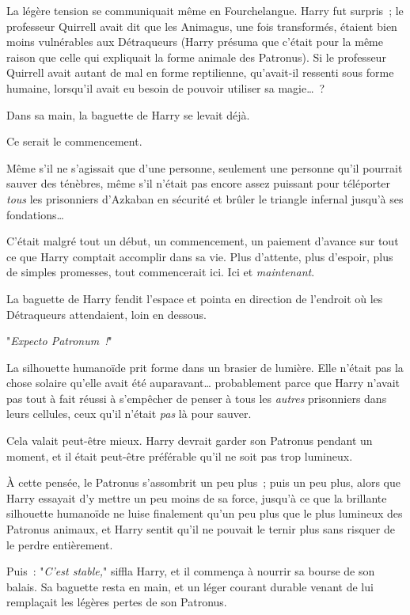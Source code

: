 La légère tension se communiquait même en Fourchelangue. Harry fut surpris~; le professeur Quirrell avait dit que les Animagus, une fois transformés, étaient bien moins vulnérables aux Détraqueurs (Harry présuma que c'était pour la même raison que celle qui expliquait la forme animale des Patronus). Si le professeur Quirrell avait autant de mal en forme reptilienne, qu'avait-il ressenti sous forme humaine, lorsqu'il avait eu besoin de pouvoir utiliser sa magie…~?

Dans sa main, la baguette de Harry se levait déjà.

Ce serait le commencement.

Même s'il ne s'agissait que d'une personne, seulement une personne qu'il pourrait sauver des ténèbres, même s'il n'était pas encore assez puissant pour téléporter \emph{tous} les prisonniers d'Azkaban en sécurité et brûler le triangle infernal jusqu'à ses fondations…

C'était malgré tout un début, un commencement, un paiement d'avance sur tout ce que Harry comptait accomplir dans sa vie. Plus d'attente, plus d'espoir, plus de simples promesses, tout commencerait ici. Ici et \emph{maintenant}.

La baguette de Harry fendit l'espace et pointa en direction de l'endroit où les Détraqueurs attendaient, loin en dessous.

"\emph{Expecto Patronum~!}"

La silhouette humanoïde prit forme dans un brasier de lumière. Elle n'était pas la chose solaire qu'elle avait été auparavant… probablement parce que Harry n'avait pas tout à fait réussi à s'empêcher de penser à tous les \emph{autres} prisonniers dans leurs cellules, ceux qu'il n'était \emph{pas} là pour sauver.

Cela valait peut-être mieux. Harry devrait garder son Patronus pendant un moment, et il était peut-être préférable qu'il ne soit pas trop lumineux.

À cette pensée, le Patronus s'assombrit un peu plus~; puis un peu plus, alors que Harry essayait d'y mettre un peu moins de sa force, jusqu'à ce que la brillante silhouette humanoïde ne luise finalement qu'un peu plus que le plus lumineux des Patronus animaux, et Harry sentit qu'il ne pouvait le ternir plus sans risquer de le perdre entièrement.

Puis~: "\emph{C'est stable,}" siffla Harry, et il commença à nourrir sa bourse de son balais. Sa baguette resta en main, et un léger courant durable venant de lui remplaçait les légères pertes de son Patronus.

